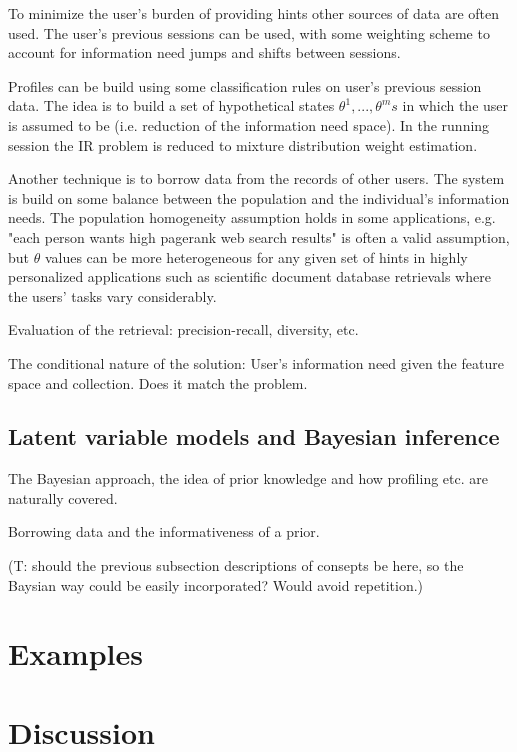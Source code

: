 \documentclass[10pt]{tufte-handout}
\begin{document}
To minimize the user's burden of providing hints other sources of data are often used. The user's previous sessions can be used, with some weighting scheme to account for information need jumps and shifts between sessions.

Profiles can be build using some classification rules on user's previous session data. The idea is to build a set of hypothetical states $\theta^1, ..., \theta^ms$ in which the user is assumed to be (i.e. reduction of the information need space). In the running session the IR problem is reduced to mixture distribution weight estimation.

Another technique is to borrow data from the records of other users. The system is build on some balance between the population and the individual's information needs. The population homogeneity assumption holds in some applications, e.g. "each person wants high pagerank web search results" is often a valid assumption, but $\theta$ values can be more heterogeneous for any given set of hints in highly personalized applications such as scientific document database retrievals where the users' tasks vary considerably.

Evaluation of the retrieval: precision-recall, diversity, etc.

The conditional nature of the solution: User's information need given the feature space and collection. Does it match the problem.

\subsection{Latent variable models and Bayesian inference}

The Bayesian approach, the idea of prior knowledge and how profiling etc. are naturally covered.

Borrowing data and the informativeness of a prior.

(T: should the previous subsection descriptions of consepts be here, so the Baysian way could be easily incorporated? Would avoid repetition.)


\section{Examples}

\section{Discussion}
\end{document}
